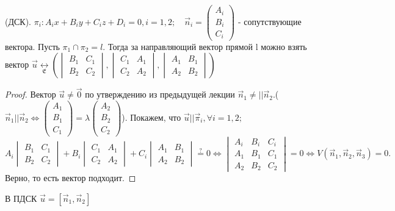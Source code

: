 \begin{proposition}
	(ДСК). \(\pi_i: A_ix+B_iy+C_iz+D_i = 0, i = 1,2;\quad \vec n_i = 
	\begin{pmatrix}
		A_i \\ B_i \\ C_i
	\end{pmatrix}\) - сопутствующие вектора. Пусть \(\pi_1 \cap \pi_2 = l.\) Тогда за направляющий вектор прямой l можно взять вектор \(\vec u \underset{\mathfrak{E}}{\longleftrightarrow} (\begin{vmatrix}
		B_1 & C_1 \\ B_2 & C_2
	\end{vmatrix}, 
	\begin{vmatrix}
		C_1 & A_1 \\ C_2 & A_2
	\end{vmatrix}, 
	\begin{vmatrix}
		A_1 & B_1 \\ A_2 & B_2
	\end{vmatrix})\)
\end{proposition}
\begin{proof}
	Вектор \(\vec u \ne \vec 0\) по утверждению из предыдущей лекции \(\vec n_1 \ne||\vec n_2\).(\(\vec n_1 || \vec n_2\Longleftrightarrow \begin{pmatrix}
		A_1 \\ B_1 \\ C_1
	\end{pmatrix}= \lambda \begin{pmatrix}
		A_2 \\ B_2 \\ C_2
	\end{pmatrix}\)). Покажем, что \(\vec u || \vec \pi_i, \forall i = 1, 2;\)\newline
	\(A_i\begin{vmatrix}
		B_1 & C_1 \\ B_2 & C_2
	\end{vmatrix}+ B_i
	\begin{vmatrix}
		C_1 & A_1 \\ C_2 & A_2
	\end{vmatrix}+C_i\begin{vmatrix}
		A_1 & B_1 \\ A_2 & B_2
	\end{vmatrix}\overset{?}{=} 0 \Longleftrightarrow \begin{vmatrix}
		A_i & B_i & C_i \\ A_1 & B_1 & C_1 \\ A_2 & B_2 & C_2
	\end{vmatrix} = 0\Longleftrightarrow V(\vec n_1, \vec n_2, \vec n_3) = 0.\) Верно, то есть вектор подходит.
\end{proof}
\begin{note}
	В ПДСК \(\vec u = [\vec n_1, \vec n_2]\)
\end{note}

